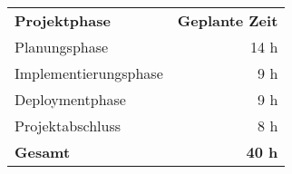 \begin{tabular}{lr}
\rowcolor{heading}\textbf{Projektphase} & \textbf{Geplante Zeit} \\
Planungsphase & 14 h \\
\rowcolor{odd}Implementierungsphase & 9 h \\
Deploymentphase & 9 h \\
\rowcolor{odd}Projektabschluss & 8 h \\
\hline
\hline
\rowcolor{odd}\textbf{Gesamt} & \textbf{40 h} \\
\end{tabular}
